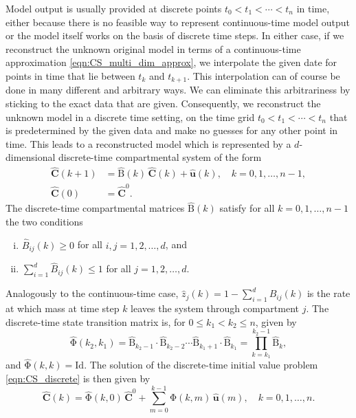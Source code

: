 \documentclass[11pt,a4paper]{article}
\renewcommand{\vec}[1]{\mathbf{#1}}
\newcommand{\tens}[1]{\mathrm{#1}}
\newcommand{\id}{\tens{Id}}
\newcommand{\suml}{\sum\limits}
\begin{document}
    Model output is usually provided at discrete points $t_0<t_1<\cdots<t_n$ in time, either because there is no feasible way to represent continuous-time model output or the model itself works on the basis of discrete time steps.
    In either case, if we reconstruct the unknown original model in terms of a continuous-time approximation \eqref{eqn:CS_multi_dim_approx}, we interpolate the given date for points in time that lie between $t_k$ and $t_{k+1}$.
    This interpolation can of course be done in many different and arbitrary ways.
    We can eliminate this arbitrariness by sticking to the exact data that are given.
    Consequently, we reconstruct the unknown model in a discrete time setting, on the time grid $t_0<t_1<\cdots<t_n$ that is predetermined by the given data and make no guesses for any other point in time.
    This leads to a reconstructed model which is represented by a $d$-dimensional discrete-time compartmental system of the form
    \begin{equation}\label{eqn:CS_discrete}
        \begin{aligned}
            \widehat{\vec{C}}(k+1) &= \widehat{\tens{B}}(k)\,\widehat{\vec{C}}(k) + \widehat{\vec{u}}(k),\quad k=0,1,\ldots,n-1,\\
            \widehat{\vec{C}}(0) &= \widehat{\vec{C}}^0.
        \end{aligned}
    \end{equation}
    The discrete-time compartmental matrices $\widehat{\tens{B}}(k)$ satisfy for all $k=0,1,\ldots,n-1$ the two conditions
    \begin{enumerate}[(i)]
        \item $\widehat{B}_{ij}(k)\geq0$ for all $i,j=1,2,\ldots,d$, and
        \item $\suml_{i=1}^d \widehat{B}_{ij}(k)\leq 1$ for all $j=1,2,\ldots,d$.
    \end{enumerate}
    Analogously to the continuous-time case, $\widehat{z}_j(k)=1-\sum_{i=1}^d \widehat{B}_{ij}(k)$ is the rate at which mass at time step $k$ leaves the system through compartment $j$.
    The discrete-time state transition matrix is, for $0\leq k_1<k_2\leq n$, given by
    \begin{equation*}
        \widehat{\tens{\Phi}}(k_2,k_1) = \widehat{\tens{B}}_{k_2-1}\cdot\widehat{\tens{B}}_{k_2-2}\cdots\widehat{\tens{B}}_{k_1+1}\cdot\widehat{\tens{B}}_{k_1} = \prod\limits_{k=k_1}^{k_2-1}\widehat{\tens{B}}_k,
    \end{equation*}
    and $\widehat{\tens{\Phi}}(k,k)=\id$.
    The solution of the discrete-time initial value problem \eqref{eqn:CS_discrete} is then given by
    \begin{equation*}
        \widehat{\vec{C}}(k) = \widehat{\tens{\Phi}}(k,0)\,\widehat{\vec{C}}^0 + \suml_{m=0}^{k-1} \widehat{\tens{\Phi}}(k,m)\,\widehat{\vec{u}}(m),\quad k=0,1,\ldots,n.
    \end{equation*}
    
\end{document}

